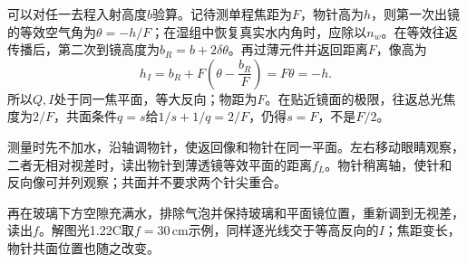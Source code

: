 \documentclass[UTF8,fontset=fandol,a4paper,11pt]{ctexart}
\begin{document}
可以对任一去程入射高度$b$验算。记待测单程焦距为$F$，物针高为$h$，则第一次出镜的等效空气角为$\theta=-h/F$；在湿组中恢复真实水内角时，应除以$n_w$。在等效往返传播后，第二次到镜高度为$b_R=b+2\delta\theta$。再过薄元件并返回距离$F$，像高为
\[
h_I=b_R+F\left(\theta-\frac{b_R}{F}\right)
=F\theta=-h.
\]
所以$Q,I$处于同一焦平面，等大反向；物距为$F$。在贴近镜面的极限，往返总光焦度为$2/F$，共面条件$q=s$给$1/s+1/q=2/F$，仍得$s=F$，不是$F/2$。

测量时先不加水，沿轴调物针，使返回像和物针在同一平面。左右移动眼睛观察，二者无相对视差时，读出物针到薄透镜等效平面的距离$f_L$。物针稍离轴，使针和反向像可并列观察；共面并不要求两个针尖重合。

再在玻璃下方空隙充满水，排除气泡并保持玻璃和平面镜位置，重新调到无视差，读出$f$。解图光1.22C取$f=30\,\mathrm{cm}$示例，同样逐光线交于等高反向的$I$；焦距变长，物针共面位置也随之改变。
\end{document}
